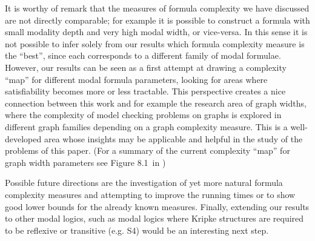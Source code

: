 \documentclass{llncs}
\begin{document}
It is worthy of remark that the measures of formula complexity we have
discussed are not directly comparable; for example it is possible to construct
a formula with small modality depth and very high modal width, or vice-versa.
In this sense it is not possible to infer solely from our results which formula
complexity measure is the ``best'', since each corresponds to a different
family of modal formulae. However, our results can be seen as a first attempt
at drawing a complexity ``map'' for different modal formula parameters, looking
for areas where satisfiability becomes more or less tractable. This perspective
creates a nice connection between this work and for example the research area
of graph widths, where the complexity of model checking problems on graphs is
explored in different graph families depending on a graph complexity measure.
This is a well-developed area whose insights may be applicable and helpful in
the study of the problems of this paper. (For a summary of the current
complexity ``map'' for graph width parameters see Figure 8.1\ in \cite{DBLP:journals/eccc/Grohe07})


Possible future directions are the investigation of yet more natural formula
complexity measures and attempting to improve the running times or to show good
lower bounds for the already known measures. Finally, extending our results to
other modal logics, such as modal logics where Kripke structures are required
to be reflexive or transitive (e.g. S4) would be an interesting next step.




 
\end{document}
